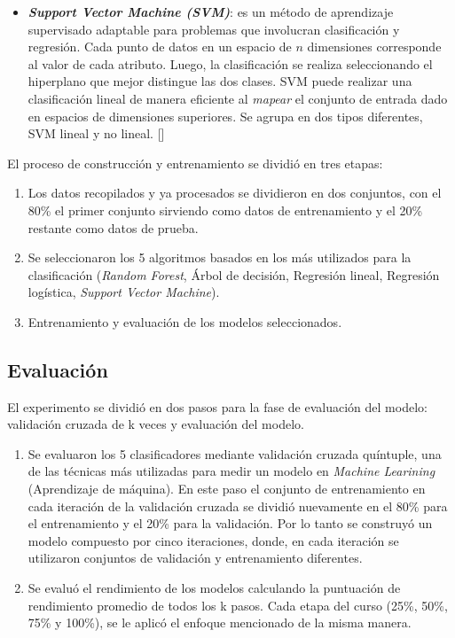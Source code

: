 \begin{itemize}
    \item \textit{\textbf{Support Vector Machine (SVM)}}: es un método de aprendizaje supervisado adaptable para problemas que involucran clasificación y regresión. Cada punto de datos en un espacio de $n$ dimensiones corresponde al valor de cada atributo. Luego, la clasificación se realiza seleccionando el hiperplano que mejor distingue las dos clases. SVM puede realizar una clasificación lineal de manera eficiente al \textit{mapear} el conjunto de entrada dado en espacios de dimensiones superiores. Se agrupa en dos tipos diferentes, SVM lineal y no lineal. [\cite{wei-meng2019python}]
\end{itemize}

El proceso de construcción y entrenamiento se dividió en tres etapas:
\begin{enumerate}
    \item Los datos recopilados y ya procesados se dividieron en dos conjuntos, con el 80\% el primer conjunto sirviendo como datos de entrenamiento y el 20\% restante como datos de prueba.
    \item Se seleccionaron los 5 algoritmos basados en los más utilizados para la clasificación (\textit{Random Forest}, Árbol de decisión, Regresión lineal, Regresión logística, \textit{Support Vector Machine}).
    \item Entrenamiento y evaluación de los modelos seleccionados.
\end{enumerate}

\subsection{Evaluación}

El experimento se dividió en dos pasos para la fase de evaluación del modelo: validación cruzada de k veces y evaluación del modelo.  

\begin{enumerate}
    \item Se evaluaron los 5 clasificadores mediante validación cruzada quíntuple, una de las técnicas más utilizadas para medir un modelo en \textit{Machine Learining} (Aprendizaje de máquina). En este paso el conjunto de entrenamiento en cada iteración de la validación cruzada se dividió nuevamente en el 80\% para el entrenamiento y el 20\% para la validación. Por lo tanto se construyó un modelo compuesto por cinco iteraciones, donde, en cada iteración se utilizaron conjuntos de validación y entrenamiento diferentes.
    \item Se evaluó el rendimiento de los modelos calculando la puntuación de rendimiento promedio de todos los k pasos. Cada etapa del curso (25\%, 50\%, 75\% y 100\%), se le aplicó el enfoque mencionado de la misma manera.
\end{enumerate}

